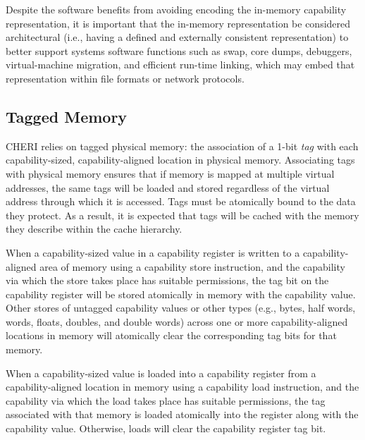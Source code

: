 Despite the software benefits from avoiding encoding the in-memory capability
representation, it is important that the in-memory representation be
considered architectural (i.e., having a defined and externally consistent
representation) to better support systems software functions such as swap,
core dumps, debuggers, virtual-machine migration, and efficient run-time
linking, which may embed that representation within file formats or network
protocols.

\subsection{Tagged Memory}
\label{sec:tagged-memory}

CHERI relies on tagged physical memory: the association of a 1-bit {\em tag}
with each capability-sized, capability-aligned location in physical memory.
Associating tags with physical memory ensures that if memory is mapped at
multiple virtual addresses, the same tags will be loaded and stored regardless
of the virtual address through which it is accessed.
Tags must be atomically bound to the data they protect.
As a result, it is expected that tags will be cached with the memory they describe within the cache hierarchy.

When a capability-sized value in a capability register is written to a
capability-aligned area of memory using a capability store instruction, and
the capability via which the store takes place has suitable permissions, the
tag bit on the capability register will be stored atomically in memory with
the capability value.
Other stores of untagged capability values or other types (e.g., bytes, half
words, words, floats, doubles, and double words) across one or more
capability-aligned locations in memory will atomically clear the corresponding
tag bits for that memory.

When a capability-sized value is loaded into a capability register from a
capability-aligned location in memory using a capability load instruction, and
the capability via which the load takes place has suitable permissions, the
tag associated with that memory is loaded atomically into the register along
with the capability value.
Otherwise, loads will clear the capability register tag bit.

